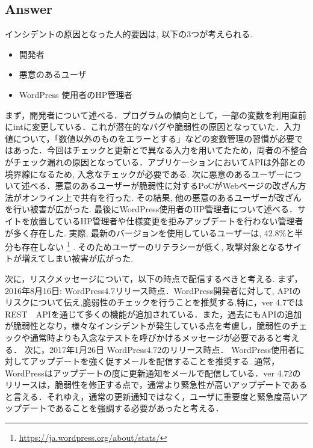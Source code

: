 \documentclass[uplatex]{jsarticle}
\begin{document}
\subsection*{Answer}
インシデントの原因となった人的要因は, 以下の3つが考えられる.
\begin{itemize}
    \item 開発者
    \item 悪意のあるユーザ
    \item WordPress 使用者のHP管理者
\end{itemize}
まず，開発者について述べる．プログラムの傾向として，一部の変数を利用直前にintに変更している．これが潜在的なバグや脆弱性の原因となっていた．入力値について，「数値以外のものをエラーとする」などの変数管理の習慣が必要ではあった．今回はチェックと更新とで異なる入力を用いてたため，両者の不整合がチェック漏れの原因となっている．アプリケーションにおいてAPIは外部との境界線になるため, 入念なチェックが必要である.
次に悪意のあるユーザーについて述べる．悪意のあるユーザーが脆弱性に対するPoCがWebページの改ざん方法がオンライン上で共有を行った. その結果, 他の悪意のあるユーザーが改ざんを行い被害が広がった.
最後にWordPress使用者のHP管理者について述べる．サイトを放置しているHP管理者や仕様変更を拒みアップデートを行わない管理者が多く存在した. 実際, 最新のバージョンを使用しているユーザーは, 42.8\%と半分も存在しない
\footnote{\url{https://ja.wordpress.org/about/stats/}}
. そのためユーザーのリテラシーが低く, 攻撃対象となるサイトが増えてしまい被害が広がった.

次に，リスクメッセージについて，以下の時点で配信するべきと考える.
まず，2016年8月16日: WordPress4.7リリース時点．WordPress開発者に対して, APIのリスクについて伝え,脆弱性のチェックを行うことを推奨する.特に，ver 4.7では REST　APIを通じて多くの機能が追加されている．また，過去にもAPIの追加が脆弱性となり，様々なインシデントが発生している点を考慮し，脆弱性のチェックや通常時よりも入念なテストを呼びかけるメッセージが必要であると考える．
次に，2017年1月26日 WordPress4.72のリリース時点．
WordPress使用者に対してアップデートを強く促すメールを配信することを推奨する.
通常，WordPressはアップデートの度に更新通知をメールで配信している．ver 4.72のリリースは，脆弱性を修正する点で，通常より緊急性が高いアップデートであると言える．それゆえ，通常の更新通知ではなく，ユーザに重要度と緊急度高いアップデートであることを強調する必要があったと考える．
\end{document}
